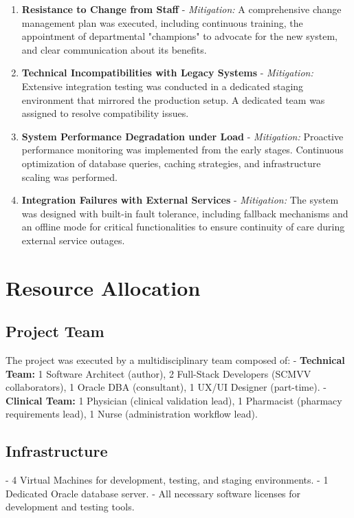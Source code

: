 \begin{enumerate}
    \item \textbf{Resistance to Change from Staff}
        - \textit{Mitigation:} A comprehensive change management plan was executed, including continuous training, the appointment of departmental "champions" to advocate for the new system, and clear communication about its benefits.
    
    \item \textbf{Technical Incompatibilities with Legacy Systems}
        - \textit{Mitigation:} Extensive integration testing was conducted in a dedicated staging environment that mirrored the production setup. A dedicated team was assigned to resolve compatibility issues.
    
    \item \textbf{System Performance Degradation under Load}
        - \textit{Mitigation:} Proactive performance monitoring was implemented from the early stages. Continuous optimization of database queries, caching strategies, and infrastructure scaling was performed.
    
    \item \textbf{Integration Failures with External Services}
        - \textit{Mitigation:} The system was designed with built-in fault tolerance, including fallback mechanisms and an offline mode for critical functionalities to ensure continuity of care during external service outages.
\end{enumerate}

\section{Resource Allocation}

\subsection{Project Team}
The project was executed by a multidisciplinary team composed of:
- \textbf{Technical Team:} 1 Software Architect (author), 2 Full-Stack Developers (SCMVV collaborators), 1 Oracle DBA (consultant), 1 UX/UI Designer (part-time).
- \textbf{Clinical Team:} 1 Physician (clinical validation lead), 1 Pharmacist (pharmacy requirements lead), 1 Nurse (administration workflow lead).

\subsection{Infrastructure}
- 4 Virtual Machines for development, testing, and staging environments.
- 1 Dedicated Oracle database server.
- All necessary software licenses for development and testing tools.

